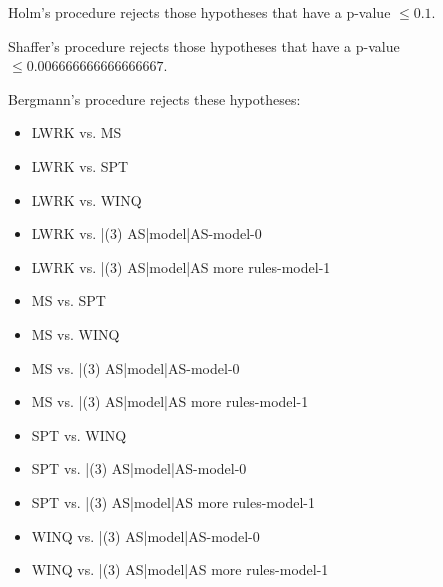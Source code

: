 \documentclass[a3paper,10pt]{article}
\begin{document}
Holm's procedure rejects those hypotheses that have a p-value $\le0.1$.


Shaffer's procedure rejects those hypotheses that have a p-value $\le0.006666666666666667$.


Bergmann's procedure rejects these hypotheses:


\begin{itemize}


\item LWRK vs. MS
\item LWRK vs. SPT
\item LWRK vs. WINQ
\item LWRK vs. |(3) AS|model|AS-model-0
\item LWRK vs. |(3) AS|model|AS more rules-model-1
\item MS vs. SPT
\item MS vs. WINQ
\item MS vs. |(3) AS|model|AS-model-0
\item MS vs. |(3) AS|model|AS more rules-model-1
\item SPT vs. WINQ
\item SPT vs. |(3) AS|model|AS-model-0
\item SPT vs. |(3) AS|model|AS more rules-model-1
\item WINQ vs. |(3) AS|model|AS-model-0
\item WINQ vs. |(3) AS|model|AS more rules-model-1
\end{itemize}
\end{document}

